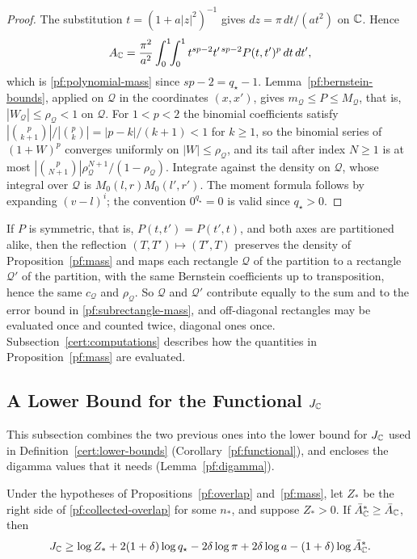 \begin{proof}
The substitution $t=(1+a|z|^2)^{-1}$ gives $dz=\pi\,dt/(at^2)$ on $\mathbb C$.
Hence
\[
 A_\mathbb C=\frac{\pi^2}{a^2}\int_0^1\!\!\int_0^1t^{sp-2}t'^{\,sp-2}
 P(t,t')^p\,dt\,dt',
\]
which is \eqref{pf:polynomial-mass} since $sp-2=q_\star-1$. Lemma~\ref{pf:bernstein-bounds}, applied on $\mathcal Q$
in the coordinates $(x,x')$, gives $m_{\mathcal Q}\le P\le M_{\mathcal Q}$, that
is, $|W_{\mathcal Q}|\le\rho_{\mathcal Q}<1$ on $\mathcal Q$. For $1<p<2$ the binomial coefficients satisfy
$|\binom p{k+1}|/|\binom pk|=|p-k|/(k+1)<1$ for $k\ge1$, so the binomial
series of $(1+W)^p$ converges uniformly on $|W|\le\rho_{\mathcal Q}$,
and its tail after index $N\ge1$ is at most
$|\binom p{N+1}|\rho_{\mathcal Q}^{N+1}/(1-\rho_{\mathcal Q})$.
Integrate against the density on $\mathcal Q$, whose integral over
$\mathcal Q$ is $M_0(l,r)M_0(l',r')$. The moment formula follows by expanding
$(v-l)^i$; the convention $0^{q_\star}=0$ is valid since $q_\star>0$.
\end{proof}

\begin{remark}\label{pf:symmetry}
If $P$ is symmetric, that is, $P(t,t')=P(t',t)$, and both axes are
partitioned alike, then the reflection $(T,T')\mapsto(T',T)$ preserves the
density of Proposition~\ref{pf:mass} and maps each rectangle $\mathcal Q$ of
the partition to a rectangle $\mathcal Q'$ of the partition, with the same
Bernstein coefficients up to transposition, hence the same $c_{\mathcal Q}$
and $\rho_{\mathcal Q}$. So $\mathcal Q$ and $\mathcal Q'$ contribute equally
to the sum and to the error bound in \eqref{pf:subrectangle-mass}, and
off-diagonal rectangles may be evaluated once and counted twice, diagonal
ones once. Subsection~\ref{cert:computations} describes how the quantities in
Proposition~\ref{pf:mass} are evaluated.
\end{remark}

\subsection{\texorpdfstring{A Lower Bound for the Functional $J_\mathbb C$}{A Lower Bound for the Functional}}

This subsection combines the two previous ones into the lower bound for $J_\mathbb C$
used in Definition~\ref{cert:lower-bounds} (Corollary~\ref{pf:functional}),
and encloses the digamma values that it needs (Lemma~\ref{pf:digamma}).

\begin{corollary}\label{pf:functional}
Under the hypotheses of Propositions~\ref{pf:overlap} and~\ref{pf:mass},
let $Z_*$ be the right side of \eqref{pf:collected-overlap} for some
$n_*$, and suppose $Z_*>0$. If $\bar A_\mathbb C^*\ge\bar A_\mathbb C$, then
\begin{equation}\label{pf:collected-functional}
 J_\mathbb C\ge\log Z_*+2(1+\delta)\log q_\star-2\delta\log\pi
 +2\delta\log a-(1+\delta)\log\bar A_\mathbb C^* .
\end{equation}
\end{corollary}

